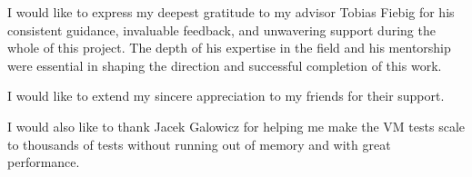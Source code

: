 
I would like to express my deepest gratitude to my advisor  Tobias Fiebig  for his consistent guidance, invaluable feedback, and unwavering support during the whole of this project. The depth of his expertise in the field and his mentorship were essential in shaping the direction and successful completion of this work.



I would like to extend my sincere appreciation to my friends for their support.

I would also like to thank Jacek Galowicz for helping me make the VM tests scale to thousands of tests without running out of memory and with great performance.
